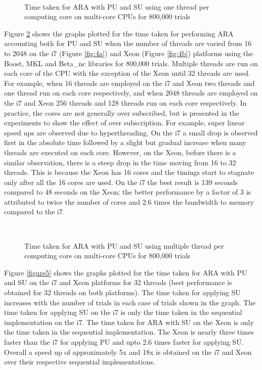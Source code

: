 \begin{figure} \centering
	 \\
\caption{Time taken for ARA with PU and SU using one thread per computing core on multi-core CPUs for 800,000 trials}
\label{figure3}
\end{figure}

Figure \ref{figure4} shows the graphs plotted for the time taken for performing ARA accounting both for PU and SU when the number of threads are varied from 16 to 2048 on the i7 (Figure \ref{fig:4a}) and Xeon (Figure \ref{fig:4b}) platforms using the Boost, MKL and Beta\_nc libraries for 800,000 trials. 
Multiple threads are run on each core of the CPU with the exception of the Xeon until 32 threads are used. 
For example, when 16 threads are employed on the i7 and Xeon two threads and one thread run on each core respectively, and when 2048 threads are employed on the i7 and Xeon 256 threads and 128 threads run on each core respectively. 
In practice, the cores are not generally over subscribed, but is presented in the experiments to show the effect of over subscription.
For example, super linear speed ups are observed due to hyperthreading. 
On the i7 a small drop is observed first in the absolute time followed by a slight but gradual increase when many threads are executed on each core. 
However, on the Xeon, before there is a similar observation, there is a steep drop in the time moving from 16 to 32 threads. 
This is because the Xeon has 16 cores and the timings start to stagnate only after all the 16 cores are used. 
On the i7 the best result is 139 seconds compared to 48 seconds on the Xeon; the better performance by a factor of 3 is attributed to twice the number of cores and 2.6 times the bandwidth to memory compared to the i7.

\begin{figure} \centering
	 \\
\caption{Time taken for ARA with PU and SU using multiple thread per computing core on multi-core CPUs for 800,000 trials}
\label{figure4}
\end{figure}

Figure \ref{figure5} shows the graphs plotted for the time taken for ARA with PU and SU on the i7 and Xeon platforms for 32 threads (best performance is obtained for 32 threads on both platforms). The time taken for applying SU increases with the number of trials in each case of trials shown in the graph. The time taken for applying SU on the i7 is only  the time taken in the sequential implementation on the i7. The time taken for ARA with SU on the Xeon is only  the time taken in the sequential implementation. The Xeon is nearly three times faster than the i7 for applying PU and upto 2.6 times faster for applying SU. Overall a speed up of approximately 5x and 18x is obtained on the i7 and Xeon over their respective sequential implementations.

